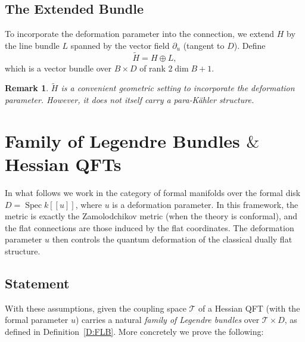 \documentclass[12pt]{amsart}
\newtheorem{remark}{Remark}
\begin{document}
\subsection{The Extended Bundle}
To incorporate the deformation parameter into the connection, we extend $H$ by the line bundle $L$ spanned by the vector field $\partial_u$ (tangent to $D$). 
Define
\[
\widetilde{H} = H \oplus L,
\]
which is a vector bundle over $B\times D$ of rank $2\dim B+1$. 

\begin{remark}
  $\widetilde{H}$ is a convenient geometric setting to incorporate the deformation parameter. However, it does not itself carry a para‑Kähler structure.
\end{remark}


\section{Family of Legendre Bundles $\&$ Hessian QFTs}\label{S:Main}
In what follows we work in the category of formal manifolds over the formal disk $D = \operatorname{Spec} k[[u]]$, where $u$ is a deformation parameter. In this framework, the metric is exactly the Zamolodchikov metric (when the theory is conformal), and the flat connections are those induced by the flat coordinates. The deformation parameter $u$ then controls the quantum deformation of the classical dually flat structure.

\subsection{Statement}
With these assumptions, given the coupling space $\mathcal{T}$ of a Hessian QFT (with the formal parameter $u$) carries a natural \emph{family of Legendre bundles} over $\mathcal{T} \times D$, as defined in Definition~\ref{D:FLB}. More concretely we prove the following: 
\end{document}
